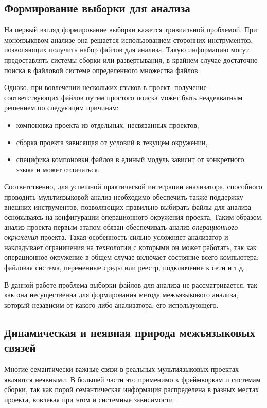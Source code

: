 \subsection{Формирование выборки для анализа}

На первый взгляд формирование выборки кажется тривиальной проблемой. При моноязыковом анализе она
решается использованием сторонних инструментов, позволяющих получить набор файлов для анализа.
Такую информацию могут предоставлять системы сборки или развертывания, в крайнем случае достаточно
поиска в файловой системе определенного множества файлов.

Однако, при вовлечении нескольких языков в проект, получение соответствующих файлов путем простого
поиска может быть неадекватным решением по следующим причинам:
\begin{itemize}
    \item компоновка проекта из отдельных, несвязанных проектов,
    \item сборка проекта зависящая от условий в текущем окружении,
    \item специфика компоновки файлов в единый модуль зависит от конкретного языка и может отличаться.
\end{itemize}

Соответственно, для успешной практической интеграции анализатора, способного проводить мультиязыковой анализ
необходимо обеспечить также поддержку внешних инструментов, позволяющих правильно выбирать файлы для
анализа основываясь на конфигурации операционного окружения проекта. Таким образом, анализ проекта
первым этапом обязан обеспечивать анализ \textit{операционного окружения} проекта. Такая особенность
сильно усложняет анализатор и накладывает ограничения на технологии с которыми он может работать, так
как операционное окружение в общем случае включает состояние всего компьютера: файловая система, переменные
среды или реестр, подключение к сети и т.д. 

В данной работе проблема выборки файлов для анализа
не рассматривается, так как она несущественна для формирования метода межъязыкового анализа, 
который независим от какого-либо анализатора, его использующего.

\subsection{Динамическая и неявная природа межъязыковых связей}

Многие семантически важные связи в реальных мультиязыковых проектах являются неявными. В большей части это применимо
к фреймворкам и системам сборки, так как порой семантическая информация распределена в разных местах проекта,
вовлекая при этом и системные зависимости \cite{professional-developers} \cite{external-dependencies}.

